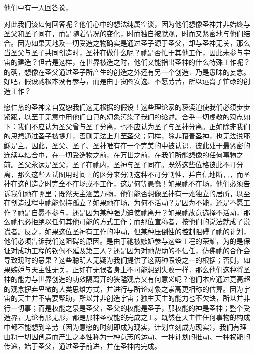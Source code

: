 他们中有一人回答说，\par

对此我们该如何回答呢？他们心中的想法纯属空谈，因为他们想像圣神并非始终与圣父和圣子同在，而是随着情况的变化，时而独自被默观，时而又紧密地与他们结合。因为如果天地及一切受造之物确实是通过圣子源于圣父，却与圣神无关，那么当圣父与圣子共同创造时，圣神在做什么呢？祂是否忙于其他工作，因此未参与宇宙的建造？但若是这样，在世界被造之时，他们又能指出圣神的什么特殊工作呢？的确，想像在圣父通过圣子所产生的创造之外还有另一个创造，乃是愚昧的妄念。好吧，假设祂根本没有参与，而是由于贪图安逸、不愿劳苦，所以远离了忙碌的创造工作？\par

愿仁慈的圣神亲自宽恕我们这无根据的假设！这些理论家的亵渎迫使我们必须步步紧跟，以至于无意中用他们自己的幻象污染了我们的论述。合乎一切虔敬的观点如下：我们不应认为圣父曾与圣子分离，也不应认为圣子与圣神分离。正如除非我们的思想通过圣子被提升，否则无法上升至圣父；同样，除非藉着圣神，也无法说耶稣是主。因此，圣父、圣子、圣神唯有在一个完美的中被认识，彼此处于最紧密的连续与结合中，在一切受造物之前，在万世之前，在我们所能想像的任何事物之前。圣父永远是圣父，圣子在祂内，圣神与圣子同在。既然这些位格彼此不可分离，那么这些人试图用时间上的区分来分割这种不可分割性，并自信地断言，而圣神在这创造之时完全不在场或不工作，这是何等愚蠢！如果祂不在场，他们必须告诉我们祂在哪里；既然天主涵盖万物，他们能否想像圣神有一处独立的居所，以至在创造过程中祂能保持孤立？如果祂在场，为何不活动？是因为不能，还是不愿工作？祂是自愿不参与，还是因为某种强力迫使祂离开？如果祂故意选择不活动，那么祂也必拒绝以任何其他可能的方式工作；而那位宣称者，按他们的说法就成了说谎者。反之，如果这位圣神有工作的冲动，但某种压倒性的控制阻碍了祂的计划，他们必须告诉我们这阻碍的原因。是由于祂被嫉妒参与这些工程的荣耀，为的是保证对成功工程的钦佩不延及第三人？还是因为对祂帮助的不信任，仿佛祂的合作会导致现时的恶果？这些聪明人无疑为我们提供了这两种假设之一的根据；否则，如果嫉妒与天主性无关，正如在无误者身上不可能想到失败一样，那么他们这种将圣神的能力与世界创造的功效隔离开的狭隘观点又有何意义呢？他们本应通过更高超的观念摒弃卑微的人类思维方式，并进行与所论对象之崇高更相称的估算。因为宇宙的天主并不需要帮助，所以并非创造宇宙；独生天主的能力也不欠缺，所以并非行一切事；而是权能之泉是圣父，圣父的权能是圣子，那权能的神是圣神；整个受造界，无论有形无形，都是那神圣权能的完成之工。既然在天主性任何事物的构成中都不能想到辛劳（因为意愿的时刻即成为现实，计划立刻成为现实），我们有理由将一切因创造而产生之本性称为一种意志的运动、一种计划的推动、一种权能的传递，始于圣父，通过圣子前进，并在圣神内完成。\par


